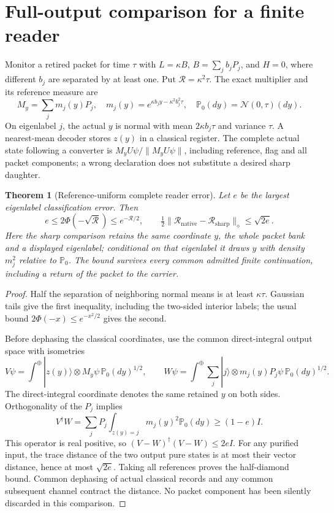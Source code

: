 \documentclass[11pt,oneside,openany]{book}
\newtheorem{theorem}{Theorem}[chapter]
\theoremstyle{definition}
\theoremstyle{remark}\newtheorem{remark}[theorem]{Remark}
\begin{document}
\section{Full-output comparison for a finite reader}

Monitor a retired packet for time $\tau$ with
$L=\kappa B$, $B=\sum_j b_jP_j$, and $H=0$, where different $b_j$
are separated by at least one. Put $\mathcal R=\kappa^2\tau$.
The exact multiplier and its reference measure are
\begin{equation}
 M_y=\sum_jm_j(y)P_j,
 \quad m_j(y)=e^{\kappa b_jy-\kappa^2b_j^2\tau},
 \quad \mathbb P_0(dy)=\mathcal N(0,\tau)(dy).               \label{det:read-multiplier}
\end{equation}
On eigenlabel $j$, the actual $y$ is normal with mean
$2\kappa b_j\tau$ and variance $\tau$. A nearest-mean decoder stores
$z(y)$ in a classical register. The complete actual state following a
converter is $M_yU\psi/\|M_yU\psi\|$, including reference, flag and
all packet components; a wrong declaration does not substitute a
desired sharp daughter.

\begin{theorem}[Reference-uniform complete reader error]
\label{det:reader-theorem}
Let $e$ be the largest eigenlabel classification error. Then
\begin{equation}
 e\le2\Phi(-\sqrt{\mathcal R})\le e^{-\mathcal R/2},
 \qquad \tfrac12\|\mathcal R_{\mathrm{native}}
                   -\mathcal R_{\mathrm{sharp}}\|_\diamond
                  \le\sqrt{2e}.                            \label{det:reader-error}
\end{equation}
Here the sharp comparison retains the same coordinate $y$, the whole
packet bank and a displayed eigenlabel; conditional on that eigenlabel
it draws $y$ with density $m_j^2$ relative to $\mathbb P_0$.
The bound survives every common admitted finite continuation, including
a return of the packet to the carrier.
\end{theorem}
\begin{proof}
Half the separation of neighboring normal means is at least
$\kappa\tau$. Gaussian tails give the first inequality, including
the two-sided interior labels; the usual bound
$2\Phi(-x)\le e^{-x^2/2}$ gives the second.

Before dephasing the classical coordinates, use the common direct-integral
output space with isometries
\[
 V\psi=\int^{\oplus}\!|z(y)\rangle\otimes M_y\psi\,
                      \mathbb P_0(dy)^{1/2},\qquad
 W\psi=\int^{\oplus}\!\sum_j|j\rangle\otimes m_j(y)P_j\psi\,
                      \mathbb P_0(dy)^{1/2}.
\]
The direct-integral coordinate denotes the same retained $y$ on both
sides. Orthogonality of the $P_j$ implies
\[
 V^\dagger W=\sum_jP_j\int_{z(y)=j}m_j(y)^2\mathbb P_0(dy)
                 \ge(1-e)I.
\]
This operator is real positive, so
$(V-W)^\dagger(V-W)\le2eI$. For any purified input, the trace
distance of the two output pure states is at most their vector
distance, hence at most $\sqrt{2e}$. Taking all references proves the
half-diamond bound. Common dephasing of actual classical records and
any common subsequent channel contract the distance. No packet
component has been silently discarded in this comparison.
\end{proof}
\end{document}
